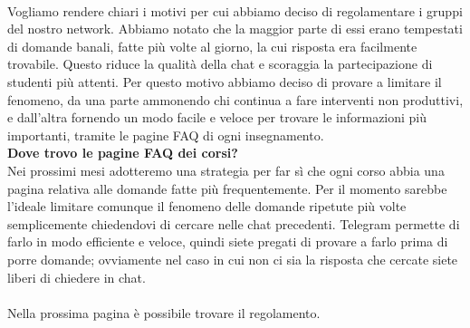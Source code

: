 \documentclass[a4paper, 11pt, oneside, article]{book} %
\begin{document}


\textcolor{red}{}\\

Vogliamo rendere chiari i motivi per cui abbiamo deciso di regolamentare i gruppi del nostro network.
Abbiamo notato che la maggior parte di essi erano tempestati di domande banali, fatte più volte al giorno, la cui risposta era facilmente trovabile. 
Questo riduce la qualità della chat e scoraggia la partecipazione di studenti più attenti. Per questo motivo abbiamo deciso di provare a limitare il fenomeno, 
da una parte ammonendo chi continua a fare interventi non produttivi, e dall'altra fornendo un modo facile e veloce per trovare le informazioni più importanti, 
tramite le pagine FAQ di ogni insegnamento.\\

\textbf{Dove trovo le pagine FAQ dei corsi?}\\

Nei prossimi mesi adotteremo una strategia per far sì che ogni corso abbia una pagina relativa alle domande fatte più frequentemente.
Per il momento sarebbe l'ideale limitare comunque il fenomeno delle domande ripetute più volte semplicemente chiedendovi di cercare nelle chat precedenti.
Telegram permette di farlo in modo efficiente e veloce, quindi siete pregati di provare a farlo prima di porre domande; ovviamente nel caso in cui non ci sia la risposta che cercate siete liberi di chiedere in chat.\\\\
Nella prossima pagina è possibile trovare il regolamento.

\newpage
\end{document}
